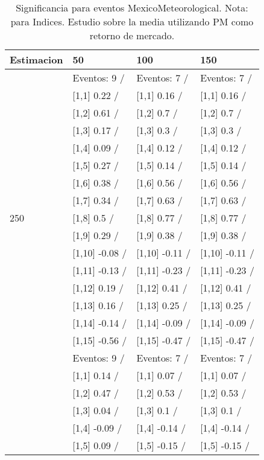 \begin{table}

\caption{Significancia para eventos MexicoMeteorological. Nota: para Indices. Estudio sobre la media utilizando PM como retorno de mercado.}
\centering
\begin{tabular}[t]{llll}
\toprule
Estimacion & 50 & 100 & 150\\
\midrule
 & Eventos:  9 / & Eventos:  7 / & Eventos:  7 /\\
 & {}[1,1] 0.22  / & {}[1,1] 0.16  / & {}[1,1] 0.16  /\\
 & {}[1,2] 0.61  / & {}[1,2] 0.7  / & {}[1,2] 0.7  /\\
 & {}[1,3] 0.17  / & {}[1,3] 0.3  / & {}[1,3] 0.3  /\\
 & {}[1,4] 0.09  / & {}[1,4] 0.12  / & {}[1,4] 0.12  /\\
\addlinespace
 & {}[1,5] 0.27  / & {}[1,5] 0.14  / & {}[1,5] 0.14  /\\
 & {}[1,6] 0.38  / & {}[1,6] 0.56  / & {}[1,6] 0.56  /\\
 & {}[1,7] 0.34  / & {}[1,7] 0.63  / & {}[1,7] 0.63  /\\
250 & {}[1,8] 0.5  / & {}[1,8] 0.77  / & {}[1,8] 0.77  /\\
 & {}[1,9] 0.29  / & {}[1,9] 0.38  / & {}[1,9] 0.38  /\\
\addlinespace
 & {}[1,10] -0.08  / & {}[1,10] -0.11  / & {}[1,10] -0.11  /\\
 & {}[1,11] -0.13  / & {}[1,11] -0.23  / & {}[1,11] -0.23  /\\
 & {}[1,12] 0.19  / & {}[1,12] 0.41  / & {}[1,12] 0.41  /\\
 & {}[1,13] 0.16  / & {}[1,13] 0.25  / & {}[1,13] 0.25  /\\
 & {}[1,14] -0.14  / & {}[1,14] -0.09  / & {}[1,14] -0.09  /\\
\addlinespace
 & {}[1,15] -0.56  / & {}[1,15] -0.47  / & {}[1,15] -0.47  /\\
 & Eventos:  9 / & Eventos:  7 / & Eventos:  7 /\\
 & {}[1,1] 0.14  / & {}[1,1] 0.07  / & {}[1,1] 0.07  /\\
 & {}[1,2] 0.47  / & {}[1,2] 0.53  / & {}[1,2] 0.53  /\\
 & {}[1,3] 0.04  / & {}[1,3] 0.1  / & {}[1,3] 0.1  /\\
\addlinespace
 & {}[1,4] -0.09  / & {}[1,4] -0.14  / & {}[1,4] -0.14  /\\
 & {}[1,5] 0.09  / & {}[1,5] -0.15  / & {}[1,5] -0.15  /\\

\end{tabular}
\end{table}
